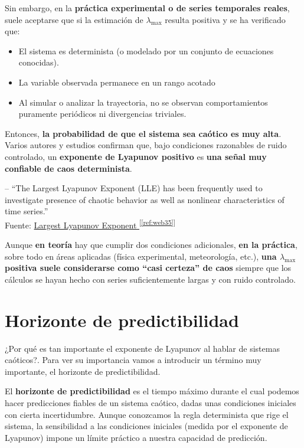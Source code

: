 \documentclass[
  10pt,
  a4paper,
  DIV=11,
  numbers=noendperiod,
  open=any]{scrreprt}
\providecommand{\tightlist}{%
  \setlength{\itemsep}{0pt}\setlength{\parskip}{0pt}}
\numberwithin{equation}{chapter}
\numberwithin{equation}{section}
\renewcommand{\[}{\begin{equation}}
\renewcommand{\]}{\end{equation}}
\newcommand{\refweb}[3]{%
  \href{#1}{#2}\textsuperscript{[\ref{ref:#3}]}%
}
\begin{document}
Sin embargo, en la \textbf{práctica experimental o de series temporales
reales}, suele aceptarse que si la estimación de \(\lambda_{\max}\)
resulta positiva y se ha verificado que:

\begin{itemize}
\tightlist
\item
  El sistema es determinista (o modelado por un conjunto de ecuaciones
  conocidas).\\
\item
  La variable observada permanece en un rango acotado
\item
  Al simular o analizar la trayectoria, no se observan comportamientos
  puramente periódicos ni divergencias triviales.
\end{itemize}

Entonces, \textbf{la probabilidad de que el sistema sea caótico es muy
alta}. Varios autores y estudios confirman que, bajo condiciones
razonables de ruido controlado, un \textbf{exponente de Lyapunov
positivo} es \textbf{una señal muy confiable de caos determinista}.

-- ``The Largest Lyapunov Exponent (LLE) has been frequently used to
investigate presence of chaotic behavior as well as nonlinear
characteristics of time series.''\\
Fuente: \refweb{https://www.sciencedirect.com/topics/engineering/largest-lyapunov-exponent}{Largest Lyapunov Exponent }{web35}

Aunque \textbf{en teoría} hay que cumplir dos condiciones adicionales,
\textbf{en la práctica}, sobre todo en áreas aplicadas (física
experimental, meteorología, etc.), \textbf{una \(\lambda_{\max}\)
positiva suele considerarse como ``casi certeza'' de caos} siempre que
los cálculos se hayan hecho con series suficientemente largas y con
ruido controlado.

\section{Horizonte de
predictibilidad}\label{horizonte-de-predictibilidad}

¿Por qué es tan importante el exponente de Lyapunov al hablar de
sistemas caóticos?. Para ver su importancia vamos a introducir un
término muy importante, el horizonte de predictibilidad.

El \textbf{horizonte de predictibilidad} es el tiempo máximo durante el
cual podemos hacer predicciones fiables de un sistema caótico, dadas
unas condiciones iniciales con cierta incertidumbre. Aunque conozcamos
la regla determinista que rige el sistema, la sensibilidad a las
condiciones iniciales (medida por el exponente de Lyapunov) impone un
límite práctico a nuestra capacidad de predicción.
\end{document}
